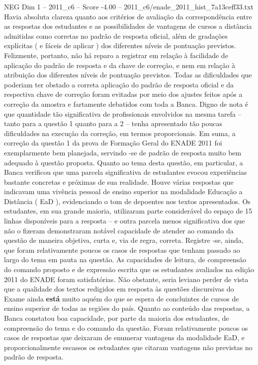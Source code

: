 \begin{textsample}{NEG Dim 1 – 2011\_c6 – Score -4.00 – 2011\_c6/enade\_2011\_hist\_7a13ceff33.txt}
Havia absoluta clareza quanto aos critérios de avaliação da correspondência entre as respostas dos estudantes e as possibilidades de vantagens de cursos a distância admitidas como corretas no padrão de resposta oficial, além de gradações explícitas ( e fáceis de aplicar ) dos diferentes níveis de pontuação previstos.
Felizmente, portanto, não há reparo a registrar em relação à facilidade de aplicação do padrão de resposta e da chave de correção, e nem em relação à atribuição dos diferentes níveis de pontuação previstos.
Todas as dificuldades que poderiam ter obstado a correta aplicação do padrão de resposta oficial e da respectiva chave de correção foram evitadas por meio dos ajustes feitos após a correção da amostra e fartamente debatidos com toda a Banca.
Digno de nota é que quantidade tão significativa de profissionais envolvidos na mesma tarefa – tanto para a questão 1 quanto para a 2 – tenha apresentado tão poucas dificuldades na execução da correção, em termos proporcionais.
Em suma, a correção da questão 1 da prova de Formação Geral do ENADE 2011 foi exemplarmente bem planejada, servindo -se de padrão de resposta muito bem adequado à questão proposta.
Quanto ao tema desta questão, em particular, a Banca verificou que uma parcela significativa de estudantes evocou experiências bastante concretas e próximas de sua realidade.
Houve várias respostas que indicavam uma vivência pessoal de ensino superior na modalidade Educação a Distância ( EaD ), evidenciando o tom de depoentes nos textos apresentados.
Os estudantes, em sua grande maioria, utilizaram parte considerável do espaço de 15 linhas disponíveis para a resposta – e outra parcela menos significativa dos que não o fizeram demonstraram notável capacidade de atender ao comando da questão de maneira objetiva, curta e, via de regra, correta.
Registre -se, ainda, que foram relativamente poucos os casos de respostas que tenham passado ao largo do tema em pauta na questão.
As capacidades de leitura, de compreensão do comando proposto e de expressão escrita que os estudantes avaliados na edição 2011 do ENADE foram satisfatórias.
Não obstante, seria leviano perder de vista que a qualidade dos textos redigidos em resposta às questões discursivas do Exame ainda \textbf{está} muito aquém do que se espera de concluintes de cursos de ensino superior de todas as regiões do país.
Quanto ao conteúdo das respostas, a Banca constatou boa capacidade, por parte da maioria dos estudantes, de compreensão do tema e do comando da questão.
Foram relativamente poucos os casos de respostas que deixaram de enumerar vantagens da modalidade EaD, e proporcionalmente escassos os estudantes que citaram vantagens não previstas no padrão de resposta.

\end{textsample}
